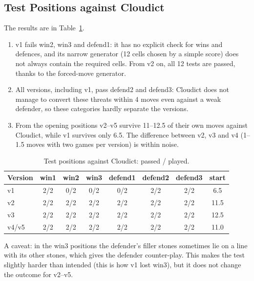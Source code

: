 \documentclass[a4paper,10pt,twocolumn]{article}
\newenvironment{points}{\begin{enumerate}[label=(\arabic*),leftmargin=*,itemsep=2pt,topsep=3pt]}{\end{enumerate}}
\begin{document}
\subsection{Test Positions against Cloudict}
The results are in Table~\ref{tab:battery}.
\begin{points}
\item v1 fails win2, win3 and defend1: it has no explicit check for wins and defences, and its narrow generator (12 cells chosen by a simple score) does not always contain the required cells. From v2 on, all 12 tests are passed, thanks to the forced-move generator.
\item All versions, including v1, pass defend2 and defend3: Cloudict does not manage to convert these threats within 4 moves even against a weak defender, so these categories hardly separate the versions.
\item From the opening positions v2--v5 survive 11--12.5 of their own moves against Cloudict, while v1 survives only 6.5. The difference between v2, v3 and v4 (1--1.5 moves with two games per version) is within noise.
\end{points}

\begin{table}[h]
\centering
\small
\setlength{\tabcolsep}{2pt}
\caption{Test positions against Cloudict: passed / played.}
\label{tab:battery}
\begin{tabular}{@{}lcccccc|c@{}}
\toprule
Version & win1 & win2 & win3 & defend1 & defend2 & defend3 & start \\
\midrule
v1 & 2/2 & \cellcolor{red!12}0/2 & \cellcolor{red!12}0/2 & \cellcolor{red!12}0/2 & 2/2 & 2/2 & 6.5 \\
v2 & 2/2 & 2/2 & 2/2 & 2/2 & 2/2 & 2/2 & 11.5 \\
v3 & 2/2 & 2/2 & 2/2 & 2/2 & 2/2 & 2/2 & 12.5 \\
v4/v5 & 2/2 & 2/2 & 2/2 & 2/2 & 2/2 & 2/2 & 11.0 \\
\bottomrule
\end{tabular}
\end{table}

A caveat: in the win3 positions the defender's filler stones sometimes lie on a line with its other stones, which gives the defender counter-play. This makes the test slightly harder than intended (this is how v1 lost win3), but it does not change the outcome for v2--v5.
\end{document}

